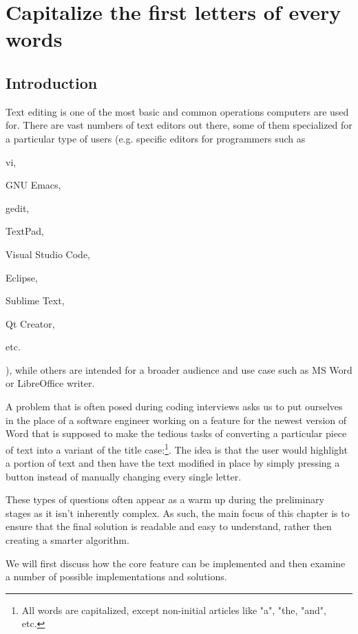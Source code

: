 %

\chapter{Capitalize the first letters of every words}
\label{ch:capitalize_words_first_letter}
\section*{Introduction}
Text editing is one of the most basic and common operations computers are used for. There are vast numbers of text editors out there, some of them specialized for a particular type of users (e.g. specific editors for programmers such as \begin{enumerate*}
	\item vi,
	\item GNU Emacs,
	\item gedit,
	\item TextPad,
	\item Visual Studio Code,
	\item Eclipse,
	\item Sublime Text,
	\item Qt Creator,
	\item etc.
\end{enumerate*}
), while others are intended for a broader audience and use case such as  MS Word or LibreOffice writer. 


A problem that is often posed during coding interviews asks us to put ourselves in the place of a software engineer working on a feature for the newest version of Word that is supposed to make the tedious tasks of converting a particular piece of text into a variant of the title case:\footnote{All words are capitalized, except non-initial articles like "a", "the, "and", etc.}.
The idea is that the user would highlight a portion of text and then have the text modified in place by simply pressing a button instead of manually changing every single letter. 


These types of questions often appear as a warm up during the preliminary stages as it isn't inherently complex.  As such, the main focus of this chapter is to ensure that the final solution is readable and easy to understand, rather then creating a smarter algorithm. 

We will first discuss how the core feature can be implemented and then examine a number of possible implementations and solutions. 


